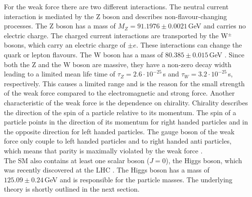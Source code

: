 \noindent For the weak force there are two different interactions. The neutral current interaction is mediated by the Z boson and describes non-flavour-changing processes. The Z boson has a mass of $M_Z=91.1976 \pm 0.0021$\,GeV \cite{SMmasses} and carries no electric charge. The charged current interactions are transported by the W$^\pm$ bosons, which carry an electric charge of $\pm e$. These interactions can change the quark or lepton flavours. The W boson has a mass of $80.385 \pm 0.015$\,GeV \cite{SMmasses}. Since both the Z and the W boson are massive, they have a non-zero decay width leading to a limited mean life time of $\tau_Z=2.6\cdot 10^{-25}$\,s and $\tau_W=3.2\cdot 10^{-25}$\,s, respectively. This causes a limited range and is the reason for the small strength of the weak force compared to the electromagnetic and strong force. Another characteristic of the weak force is the dependence on chirality. Chirality describes the direction of the spin of a particle relative to its momentum. The spin of a particle points in the direction of its momentum for right handed particles and in the opposite direction for left handed particles. The gauge boson of the weak force only couple to left handed particles and to right handed anti particles, which means that parity is maximally violated by the weak force \cite{wu}. \\

\noindent The SM also contains at least one scalar boson ($J=0$), the Higgs boson, which was recently discovered at the LHC \cite{cms_higgsdiscov,atlas_higgsdiscov}. The Higgs boson has a mass of $125.09 \pm 0.24$\,GeV and is responsible for the particle masses. The underlying theory is shortly outlined in the next section.\\

